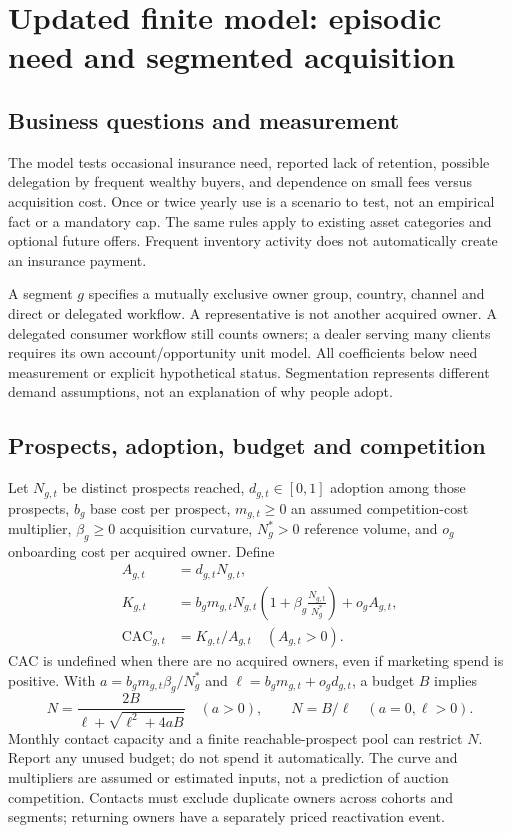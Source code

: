 \documentclass[11pt,a4paper]{article}
\begin{document}
\section{Updated finite model: episodic need and segmented acquisition}

\subsection{Business questions and measurement}
The model tests occasional insurance need, reported lack of retention, possible delegation by frequent wealthy buyers, and dependence on small fees versus acquisition cost. Once or twice yearly use is a scenario to test, not an empirical fact or a mandatory cap. The same rules apply to existing asset categories and optional future offers. Frequent inventory activity does not automatically create an insurance payment.

A segment $g$ specifies a mutually exclusive owner group, country, channel and direct or delegated workflow. A representative is not another acquired owner. A delegated consumer workflow still counts owners; a dealer serving many clients requires its own account/opportunity unit model. All coefficients below need measurement or explicit hypothetical status. Segmentation represents different demand assumptions, not an explanation of why people adopt.

\subsection{Prospects, adoption, budget and competition}
Let $N_{g,t}$ be distinct prospects reached, $d_{g,t}\in[0,1]$ adoption among those prospects, $b_g$ base cost per prospect, $m_{g,t}\geq0$ an assumed competition-cost multiplier, $\beta_g\geq0$ acquisition curvature, $N_g^*>0$ reference volume, and $o_g$ onboarding cost per acquired owner. Define
\begin{align}
 A_{g,t}&=d_{g,t}N_{g,t},\\
 K_{g,t}&=b_gm_{g,t}N_{g,t}
       \left(1+\beta_g\frac{N_{g,t}}{N_g^*}\right)+o_gA_{g,t},\\
 \operatorname{CAC}_{g,t}&=K_{g,t}/A_{g,t}\quad (A_{g,t}>0).
\end{align}
CAC is undefined when there are no acquired owners, even if marketing spend is positive. With $a=b_gm_{g,t}\beta_g/N_g^*$ and $\ell=b_gm_{g,t}+o_gd_{g,t}$, a budget $B$ implies
\begin{equation}
 N=\frac{2B}{\ell+\sqrt{\ell^2+4aB}}\quad(a>0),
 \qquad N=B/\ell\quad(a=0,\ell>0).
\end{equation}
Monthly contact capacity and a finite reachable-prospect pool can restrict $N$. Report any unused budget; do not spend it automatically. The curve and multipliers are assumed or estimated inputs, not a prediction of auction competition. Contacts must exclude duplicate owners across cohorts and segments; returning owners have a separately priced reactivation event.
\end{document}
